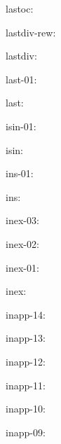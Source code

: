 \documentclass[a4paper]{article}
\begin{document}
lastoc:\\ 

\bigskip

lastdiv-rew:\\ 

\bigskip

lastdiv:\\ 

\bigskip

last-01:\\ 

\bigskip

last:\\ 

\bigskip

isin-01:\\ 

\bigskip

isin:\\ 

\bigskip

ins-01:\\ 

\bigskip

ins:\\ 

\bigskip

inex-03:\\ 

\bigskip

inex-02:\\ 

\bigskip

inex-01:\\ 

\bigskip

inex:\\ 

\bigskip

inapp-14:\\ 

\bigskip

inapp-13:\\ 

\bigskip

inapp-12:\\ 

\bigskip

inapp-11:\\ 

\bigskip

inapp-10:\\ 

\bigskip

inapp-09:\\ 
\end{document}
